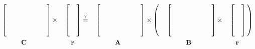 \begin{alignat*}{5}
  &\begin{bmatrix}
    &&&&&&\\
    &&&&&&\\
    &&&&&&\\
    &&&&&&
  \end{bmatrix}
  \times
  &&\begin{bmatrix}
    &\\
    &\\
    &\\
    &
  \end{bmatrix}
  \?
  &&\begin{bmatrix}
    &&&&&&\\
    &&&&&&\\
    &&&&&&\\
    &&&&&&
  \end{bmatrix}
  \times
  \bigsl(
    &&\begin{bmatrix}
      &&&&&&\\
      &&&&&&\\
      &&&&&&\\
      &&&&&&
    \end{bmatrix}
    \times
    &&\begin{bmatrix}
      &\\
      &\\
      &\\
      &
    \end{bmatrix}
  \bigsr)\\
  &  \quad\quad\quad \mathbf C
  && \quad \mathbf r
  && \quad\quad\quad \mathbf A
  && \quad\quad\quad \mathbf B
  && \quad \mathbf r
  \end{alignat*}
